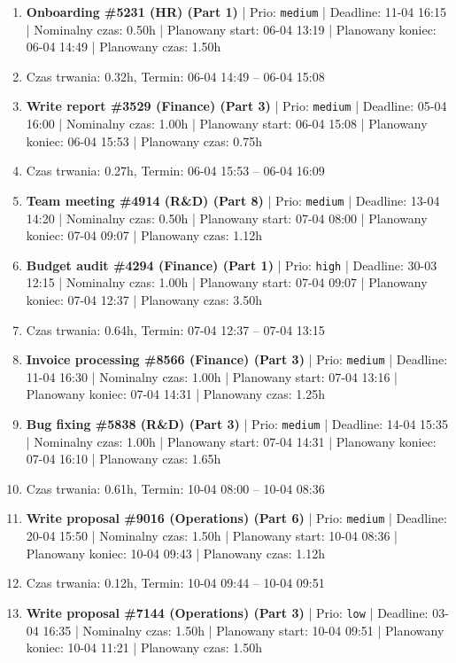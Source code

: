 {\begin{enumerate}
  \item [\textbf{14671}] \textbf{Onboarding \#5231 (HR) (Part 1)} | Prio: \texttt{medium} | Deadline: 11-04 16:15 | Nominalny czas: 0.50h | Planowany start: 06-04 13:19 | Planowany koniec: 06-04 14:49 | Planowany czas: 1.50h
  \item [\textbf{PRZERWA}] Czas trwania: 0.32h, Termin: 06-04 14:49 -- 06-04 15:08
  \item [\textbf{14672}] \textbf{Write report \#3529 (Finance) (Part 3)} | Prio: \texttt{medium} | Deadline: 05-04 16:00 | Nominalny czas: 1.00h | Planowany start: 06-04 15:08 | Planowany koniec: 06-04 15:53 | Planowany czas: 0.75h
  \item [\textbf{PRZERWA}] Czas trwania: 0.27h, Termin: 06-04 15:53 -- 06-04 16:09
  \item [\textbf{14638}] \textbf{Team meeting \#4914 (R\&D) (Part 8)} | Prio: \texttt{medium} | Deadline: 13-04 14:20 | Nominalny czas: 0.50h | Planowany start: 07-04 08:00 | Planowany koniec: 07-04 09:07 | Planowany czas: 1.12h
  \item [\textbf{14619}] \textbf{Budget audit \#4294 (Finance) (Part 1)} | Prio: \texttt{high} | Deadline: 30-03 12:15 | Nominalny czas: 1.00h | Planowany start: 07-04 09:07 | Planowany koniec: 07-04 12:37 | Planowany czas: 3.50h
  \item [\textbf{PRZERWA}] Czas trwania: 0.64h, Termin: 07-04 12:37 -- 07-04 13:15
  \item [\textbf{14675}] \textbf{Invoice processing \#8566 (Finance) (Part 3)} | Prio: \texttt{medium} | Deadline: 11-04 16:30 | Nominalny czas: 1.00h | Planowany start: 07-04 13:16 | Planowany koniec: 07-04 14:31 | Planowany czas: 1.25h
  \item [\textbf{14637}] \textbf{Bug fixing \#5838 (R\&D) (Part 3)} | Prio: \texttt{medium} | Deadline: 14-04 15:35 | Nominalny czas: 1.00h | Planowany start: 07-04 14:31 | Planowany koniec: 07-04 16:10 | Planowany czas: 1.65h
  \item [\textbf{PRZERWA}] Czas trwania: 0.61h, Termin: 10-04 08:00 -- 10-04 08:36
  \item [\textbf{14662}] \textbf{Write proposal \#9016 (Operations) (Part 6)} | Prio: \texttt{medium} | Deadline: 20-04 15:50 | Nominalny czas: 1.50h | Planowany start: 10-04 08:36 | Planowany koniec: 10-04 09:43 | Planowany czas: 1.12h
  \item [\textbf{PRZERWA}] Czas trwania: 0.12h, Termin: 10-04 09:44 -- 10-04 09:51
  \item [\textbf{14702}] \textbf{Write proposal \#7144 (Operations) (Part 3)} | Prio: \texttt{low} | Deadline: 03-04 16:35 | Nominalny czas: 1.50h | Planowany start: 10-04 09:51 | Planowany koniec: 10-04 11:21 | Planowany czas: 1.50h

\end{enumerate}}
